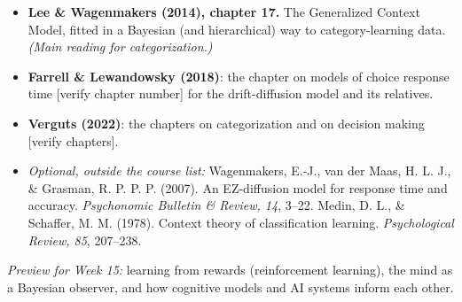 \begin{itemize}
\tightlist
\item
  \textbf{Lee \& Wagenmakers (2014), chapter 17.} The Generalized
  Context Model, fitted in a Bayesian (and hierarchical) way to
  category-learning data. \emph{(Main reading for categorization.)}
\item
  \textbf{Farrell \& Lewandowsky (2018)}: the chapter on models of
  choice response time {[}verify chapter number{]} for the
  drift-diffusion model and its relatives.
\item
  \textbf{Verguts (2022)}: the chapters on categorization and on
  decision making {[}verify chapters{]}.
\item
  \emph{Optional, outside the course list:} Wagenmakers, E.-J., van der
  Maas, H. L. J., \& Grasman, R. P. P. P. (2007). An EZ-diffusion model
  for response time and accuracy. \emph{Psychonomic Bulletin \& Review,
  14}, 3--22. Medin, D. L., \& Schaffer, M. M. (1978). Context theory of
  classification learning. \emph{Psychological Review, 85}, 207--238.
\end{itemize}

\emph{Preview for Week 15:} learning from rewards (reinforcement
learning), the mind as a Bayesian observer, and how cognitive models and
AI systems inform each other.

